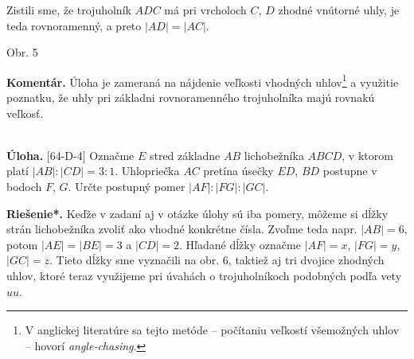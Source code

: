 \documentclass[11pt,a4paper,oneside,final]{book}
\newcommand{\kom}{\textbf{Komentár.} }
\newcommand{\ul}{\textbf{Úloha.} }
\newcommand{\rieh}{\textbf{Riešenie*.} }
\begin{document}
Zistili sme, že trojuholník $ADC$ má pri vrcholoch $C$, $D$ zhodné vnútorné uhly, je
teda rovnoramenný, a preto $|AD| = |AC|$.
\begin{center}

Obr. 5
\end{center}
\kom Úloha je zameraná na nájdenie veľkosti vhodných uhlov\footnote{V anglickej literatúre sa tejto metóde -- počítaniu veľkostí všemožných uhlov -- hovorí \textit{angle-chasing}.} a využitie poznatku, že uhly pri základni rovnoramenného trojuholníka majú rovnakú veľkosť.\\
\\
\begin{tcolorbox}[breakable,notitle,boxrule=0pt,colback=light-gray,colframe=light-gray]\ul [64-D-4] Označme $E$ stred základne $AB$ lichobežníka $ABCD$, v ktorom platí $|AB| : |CD| = 3 : 1$. Uhlopriečka $AC$ pretína úsečky $ED$, $BD$ postupne v bodoch $F$, $G$. Určte postupný pomer $|AF| : |FG| : |GC|$.

\end{tcolorbox}

\rieh  Keďže v zadaní aj v otázke úlohy sú iba pomery, môžeme si dĺžky strán lichobežníka zvoliť ako vhodné konkrétne čísla. Zvoľme teda napr. $|AB| = 6$, potom $|AE| = |BE| = 3$ a $|CD| = 2$. Hľadané dĺžky označme $|AF| = x$, $|FG| = y$, $|GC| = z$. Tieto dĺžky sme vyznačili na obr. 6, taktiež aj tri dvojice zhodných uhlov, ktoré teraz využijeme pri úvahách o trojuholníkoch podobných podľa vety $uu$.
\end{document}
